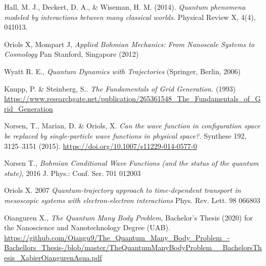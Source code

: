 \documentclass[11pt, a4paper]{article} %
\begin{document}
Hall, M. J., Deckert, D. A., \& Wiseman, H. M. (2014). {\em Quantum phenomena modeled by interactions between many classical worlds.} Physical Review X, 4(4), 041013.



 


\begin{thebibliography}{1}

	Oriols X, Mompart J, {\em Applied Bohmian Mechanics: From Nanoscale Systems to Cosmology} Pan Stanford, Singapore (2012)
	

Wyatt R. E., {\em Quantum Dynamics with Trajectories} (Springer, Berlin, 2006)


Knupp, P. \& Steinberg, S.. {\em The Fundamentals of Grid Generation.} (1993) \href{https://www.researchgate.net/publication/265361548_The_Fundamentals_of_Grid_Generation}{https://www.researchgate.net/publication/265361548\_The\_Fundamentals\_of\_Grid\_Generation} 

Norsen, T., Marian, D. \& Oriols, X. {\em Can the wave function in configuration space be replaced by single-particle wave functions in physical space?.} Synthese 192, 3125–3151 (2015). \href{https://doi.org/10.1007/s11229-014-0577-0}{https://doi.org/10.1007/s11229-014-0577-0}


Norsen T., {\em Bohmian Conditional Wave Functions (and the status of the quantum state)}, 2016 J. Phys.: Conf. Ser. 701 012003

	Oriols X. 2007 {\em Quantum-trajectory approach to time-dependent transport in mesoscopic systems with electron-electron interactions} Phys. Rev. Lett. 98 066803
	
	Oianguren X., {\em The Quantum Many Body Problem}, Bachelor's Thesis (2020) for the Nanoscience and Nanotechnology Degree (UAB).
\href{https://github.com/Oiangu9/The\_Quantum\_Many\_Body\_Problem\_-Bachellors\_Thesis-/blob/master/TheQuantumManyBodyProblem\_\_BachelorsThesis\_XabierOiangurenAsua.pdf}{https://github.com/Oiangu9/The\_Quantum\_Many\_Body\_Problem\_-Bachellors\_Thesis-/blob/master/TheQuantumManyBodyProblem\_\_BachelorsThesis\_XabierOiangurenAsua.pdf}



\end{thebibliography}
\end{document}
